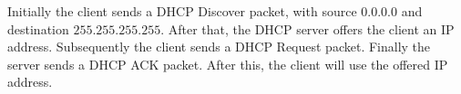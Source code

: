 Initially the client sends a DHCP Discover packet, with source $0.0.0.0$ and destination $255.255.255.255$. After that, the DHCP server offers the client an IP address. Subsequently the client sends a DHCP Request packet. Finally the server sends a DHCP ACK packet. After this, the client will use the offered IP address.
